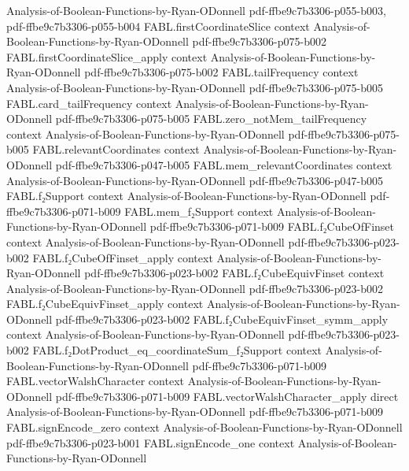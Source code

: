 \begin{theorem}
  {Analysis-of-Boolean-Functions-by-Ryan-ODonnell}
  {pdf-ffbe9c7b3306-p055-b003,
    pdf-ffbe9c7b3306-p055-b004}
\proofstep
  {FABL.firstCoordinateSlice}
  {context}
  {Analysis-of-Boolean-Functions-by-Ryan-ODonnell}
  {pdf-ffbe9c7b3306-p075-b002}
\proofstep
  {FABL.firstCoordinateSlice_apply}
  {context}
  {Analysis-of-Boolean-Functions-by-Ryan-ODonnell}
  {pdf-ffbe9c7b3306-p075-b002}
\proofstep
  {FABL.tailFrequency}
  {context}
  {Analysis-of-Boolean-Functions-by-Ryan-ODonnell}
  {pdf-ffbe9c7b3306-p075-b005}
\proofstep
  {FABL.card_tailFrequency}
  {context}
  {Analysis-of-Boolean-Functions-by-Ryan-ODonnell}
  {pdf-ffbe9c7b3306-p075-b005}
\proofstep
  {FABL.zero_notMem_tailFrequency}
  {context}
  {Analysis-of-Boolean-Functions-by-Ryan-ODonnell}
  {pdf-ffbe9c7b3306-p075-b005}
\proofstep
  {FABL.relevantCoordinates}
  {context}
  {Analysis-of-Boolean-Functions-by-Ryan-ODonnell}
  {pdf-ffbe9c7b3306-p047-b005}
\proofstep
  {FABL.mem_relevantCoordinates}
  {context}
  {Analysis-of-Boolean-Functions-by-Ryan-ODonnell}
  {pdf-ffbe9c7b3306-p047-b005}
\proofstep
  {FABL.f₂Support}
  {context}
  {Analysis-of-Boolean-Functions-by-Ryan-ODonnell}
  {pdf-ffbe9c7b3306-p071-b009}
\proofstep
  {FABL.mem_f₂Support}
  {context}
  {Analysis-of-Boolean-Functions-by-Ryan-ODonnell}
  {pdf-ffbe9c7b3306-p071-b009}
\proofstep
  {FABL.f₂CubeOfFinset}
  {context}
  {Analysis-of-Boolean-Functions-by-Ryan-ODonnell}
  {pdf-ffbe9c7b3306-p023-b002}
\proofstep
  {FABL.f₂CubeOfFinset_apply}
  {context}
  {Analysis-of-Boolean-Functions-by-Ryan-ODonnell}
  {pdf-ffbe9c7b3306-p023-b002}
\proofstep
  {FABL.f₂CubeEquivFinset}
  {context}
  {Analysis-of-Boolean-Functions-by-Ryan-ODonnell}
  {pdf-ffbe9c7b3306-p023-b002}
\proofstep
  {FABL.f₂CubeEquivFinset_apply}
  {context}
  {Analysis-of-Boolean-Functions-by-Ryan-ODonnell}
  {pdf-ffbe9c7b3306-p023-b002}
\proofstep
  {FABL.f₂CubeEquivFinset_symm_apply}
  {context}
  {Analysis-of-Boolean-Functions-by-Ryan-ODonnell}
  {pdf-ffbe9c7b3306-p023-b002}
\proofstep
  {FABL.f₂DotProduct_eq_coordinateSum_f₂Support}
  {context}
  {Analysis-of-Boolean-Functions-by-Ryan-ODonnell}
  {pdf-ffbe9c7b3306-p071-b009}
\proofstep
  {FABL.vectorWalshCharacter}
  {context}
  {Analysis-of-Boolean-Functions-by-Ryan-ODonnell}
  {pdf-ffbe9c7b3306-p071-b009}
\proofstep
  {FABL.vectorWalshCharacter_apply}
  {direct}
  {Analysis-of-Boolean-Functions-by-Ryan-ODonnell}
  {pdf-ffbe9c7b3306-p071-b009}
\proofstep
  {FABL.signEncode_zero}
  {context}
  {Analysis-of-Boolean-Functions-by-Ryan-ODonnell}
  {pdf-ffbe9c7b3306-p023-b001}
\proofstep
  {FABL.signEncode_one}
  {context}
  {Analysis-of-Boolean-Functions-by-Ryan-ODonnell}

\end{theorem}

